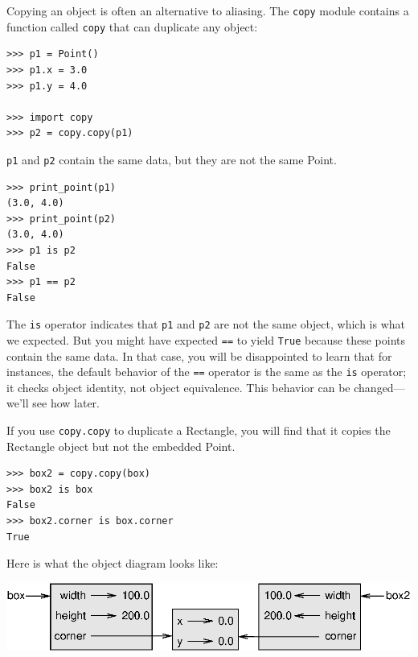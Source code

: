 \documentclass[10pt]{book}
\begin{document}

Copying an object is often an alternative to aliasing.
The {\tt copy} module contains a function called {\tt copy} that
can duplicate any object:

\beforeverb
\begin{verbatim}
>>> p1 = Point()
>>> p1.x = 3.0
>>> p1.y = 4.0

>>> import copy
>>> p2 = copy.copy(p1)
\end{verbatim}
\afterverb
%
{\tt p1} and {\tt p2} contain the same data, but they are
not the same Point.

\beforeverb
\begin{verbatim}
>>> print_point(p1)
(3.0, 4.0)
>>> print_point(p2)
(3.0, 4.0)
>>> p1 is p2
False
>>> p1 == p2
False
\end{verbatim}
\afterverb
%
The {\tt is} operator indicates that {\tt p1} and {\tt p2} are not the
same object, which is what we expected.  But you might have expected
{\tt ==} to yield {\tt True} because these points contain the same
data.  In that case, you will be disappointed to learn that for
instances, the default behavior of the {\tt ==} operator is the same
as the {\tt is} operator; it checks object identity, not object
equivalence.  This behavior can be changed---we'll see how later.


If you use {\tt copy.copy} to duplicate a Rectangle, you will find
that it copies the Rectangle object but not the embedded Point.


\beforeverb
\begin{verbatim}
>>> box2 = copy.copy(box)
>>> box2 is box
False
>>> box2.corner is box.corner
True
\end{verbatim}
\afterverb
%
Here is what the object diagram looks like:


\vspace{0.1in}
\beforefig
\centerline{\includegraphics{figs/rectangle2.eps}}
\afterfig
\vspace{0.1in}
\end{document}
